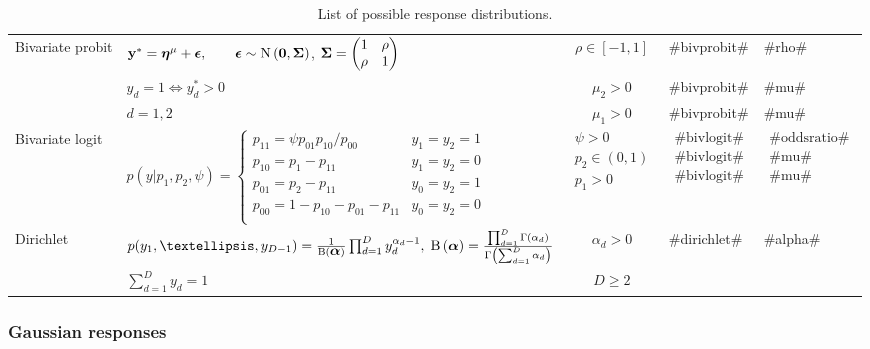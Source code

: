\begin{sidewaystable}[htbp]
\begin{center}
\begin{tabular}{l l c l l}
Bivariate probit &$\mathbf{y}^\ast=\boldsymbol{\eta}^{\mu}+\mbox{\boldmath $\epsilon$}, \qquad \mbox{\boldmath $\epsilon$}\sim\mbox{N}\left(\boldsymbol{0},\mbox{\boldmath $\Sigma$}\right)$,
$\mbox{\boldmath $\Sigma$} = \left(\begin{matrix}
1 & \rho\\
\rho& 1\\
\end{matrix}\right)$&$\rho\in[-1,1]$&#bivprobit#&#rho#\\
&$y_{d}=1 \Longleftrightarrow y_{d}^\ast	> 0$&$\mu_2>0$&#bivprobit#&#mu#\\
&$d=1,2$&$\mu_1>0$&#bivprobit#&#mu#\\\hline
Bivariate logit & $p(y|p_1,p_2,\psi)=\begin{cases}
p_{11}=\psi p_{01}p_{10}/p_{00} & y_1=y_2=1\\p_{10}=p_1-p_{11} & y_1=y_2=0\\
p_{01}=p_2-p_{11} & y_0=y_2=1\\
p_{00}=1-p_{10}-p_{01}-p_{11} & y_0=y_2=0\\
 	\end{cases}$&$\begin{matrix} \psi>0\\p_2\in(0,1)\\p_1>0
 	\end{matrix}$ &$\begin{matrix} \text{#bivlogit#}\\\text{#bivlogit#}\\\text{#bivlogit#}
\end{matrix}$&$\begin{matrix} \text{#oddsratio#}\\\text{#mu#}\\\text{#mu#}
\end{matrix}$\\\hline
Dirichlet &$p(y_1,\ldots,y_{D-1}) = \frac{1}{\B(\alphavec)}\prod_{d=1}^{D}y_d^{\alpha_d-1},\;\B{(\alphavec)}=\frac{\prod_{d=1}^{D}\Gamma(\alpha_d)}{\Gamma\left(\sum_{d=1}^{D}\alpha_d\right)}$&$\alpha_d>0$&#dirichlet#&#alpha#\\	
&$\sum_{d=1}^D y_d = 1$&$D\geq 2$&&\\
\hline\hline
\end{tabular}
\end{center}\caption{List of possible response distributions.}\label{tab:distrBayesX4}
\end{sidewaystable}



\subsubsection*{Gaussian responses}

